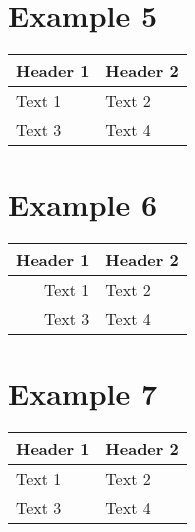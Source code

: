 \section{Example 5}\label{example-5}

\begin{longtable}[c]{@{}ll@{}}
\toprule
\textbf{Header 1} & Header 2\tabularnewline
\midrule
\endhead
Text 1\autocite{source} & Text 2\tabularnewline
Text 3 & Text 4\tabularnewline
\bottomrule
\end{longtable}

\section{Example 6}\label{example-6}

\begin{longtable}[c]{@{}rl@{}}
\toprule
Header 1 & Header 2\tabularnewline
\midrule
\endhead
Text 1 & Text 2\tabularnewline
Text 3 & Text 4\tabularnewline
\bottomrule
\end{longtable}

\section{Example 7}\label{example-7}

\begin{longtable}[c]{@{}ll@{}}
\toprule
\begin{minipage}[b]{0.38\columnwidth}\raggedright\strut
Header 1
\strut\end{minipage} &
\begin{minipage}[b]{0.56\columnwidth}\raggedright\strut
Header 2
\strut\end{minipage}\tabularnewline
\midrule
\endhead
\begin{minipage}[t]{0.38\columnwidth}\raggedright\strut
Text 1
\strut\end{minipage} &
\begin{minipage}[t]{0.56\columnwidth}\raggedright\strut
Text 2
\strut\end{minipage}\tabularnewline
\begin{minipage}[t]{0.38\columnwidth}\raggedright\strut
Text 3
\strut\end{minipage} &
\begin{minipage}[t]{0.56\columnwidth}\raggedright\strut
Text 4
\strut\end{minipage}\tabularnewline
\bottomrule
\end{longtable}

